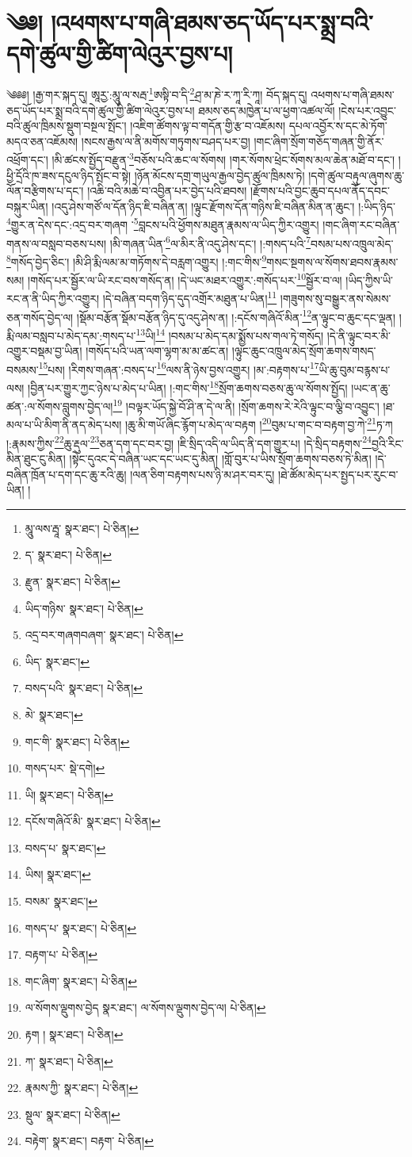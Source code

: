 \setcounter{footnote}{0} 
\chapter{༄༅། །འཕགས་པ་གཞི་ཐམས་ཅད་ཡོད་པར་སྨྲ་བའི་དགེ་ཚུལ་གྱི་ཚིག་ལེའུར་བྱས་པ།}༄༅༅། །རྒྱ་གར་སྐད་དུ། ཨཱརྱ་:མཱུ་ལ་སརྦ་\footnote{མཱུ་ལས་རྦཱ་  སྣར་ཐང་།  པེ་ཅིན། }ཨསྟི་བ་དི་\footnote{ད་  སྣར་ཐང་།  པེ་ཅིན། }ཤྲ་མ་ཎེ་ར་ཀཱ་རི་ཀཱ། བོད་སྐད་དུ། འཕགས་པ་གཞི་ཐམས་ཅད་ཡོད་པར་སྨྲ་བའི་དགེ་ཚུལ་གྱི་ཚིག་ལེའུར་བྱས་པ། ཐམས་ཅད་མཁྱེན་པ་ལ་ཕྱག་འཚལ་ལོ། །ངེས་པར་འབྱུང་བའི་ཚུལ་ཁྲིམས་སྡུག་བསྔལ་སྤོང་། །འཇིག་ཚོགས་ལྟ་བ་གདོན་གྱི་རྩ་བ་འཇོམས། དཔལ་འབྱོར་ས་དང་མེ་ཏོག་མདའ་ཅན་འཇོམས། །སངས་རྒྱས་ལ་ནི་མགོས་གཏུགས་བཤད་པར་བྱ། །གང་ཞིག་སྲོག་གཅོད་གཞན་གྱི་ནོར་འཕྲོག་དང་། །མི་ཚངས་སྤྱོད་བརྫུན་\footnote{རྫུན་  སྣར་ཐང་།  པེ་ཅིན། }བཅོས་པའི་ཆང་ལ་སོགས། །གར་སོགས་ཕྲེང་སོགས་མལ་ཆེན་མཐོ་བ་དང་། །ཕྱི་དྲོའི་ཁ་ཟས་དངུལ་ཉིད་སྤོང་བ་སྟེ། །ཉོན་མོངས་དགྲ་གཡུལ་རྒྱལ་བྱེད་ཚུལ་ཁྲིམས་ཏེ། །དགེ་ཚུལ་བརྟུལ་ཞུགས་ཆུ་ལོན་བརྩིགས་པ་དང་། །འཆི་བའི་མཆེ་བ་འབྱིན་པར་བྱེད་པའི་ཐབས། །རྫོགས་པའི་བྱང་ཆུབ་དཔལ་ནོད་དབང་བསྐུར་ཡིན། །འདུ་ཤེས་གཙོ་ལ་དོན་ཉིད་ཇི་བཞིན་ན། །ལྟུང་རྫོགས་དོན་གཉིས་ཇི་བཞིན་མིན་ན་ཆུང་། །:ཡིད་ཉིད་\footnote{ཡིད་གཉིས་  སྣར་ཐང་།  པེ་ཅིན། }གྱུར་ན་དེས་དང་:འདྲ་བར་གཞག ་\footnote{འདྲ་བར་གཞགབཞག་  སྣར་ཐང་།  པེ་ཅིན། }བླངས་པའི་ཕྱོགས་མཐུན་རྣམས་ལ་ཡིད་ཀྱིར་འགྱུར། །གང་ཞིག་རང་བཞིན་གནས་ལ་བསླབ་བཅས་པས། །མི་གཞན་ཡིན་\footnote{ཡིད་  སྣར་ཐང་། }ལ་མིར་ནི་འདུ་ཤེས་དང་། །:གསད་པའི་\footnote{བསད་པའི་  སྣར་ཐང་།  པེ་ཅིན། }བསམ་པས་འཁྲུལ་མེད་\footnote{མེ་  སྣར་ཐང་། }གསོད་བྱེད་ཅིང་། །མི་ཤི་རྨི་ལམ་མ་གཏོགས་དེ་བརླག་འགྱུར། །:གང་གིས་\footnote{གང་གི་  སྣར་ཐང་།  པེ་ཅིན། }གསང་སྔགས་ལ་སོགས་ཐབས་རྣམས་སམ། །གསོད་པར་སྦྱོར་ལ་ཡི་རང་བས་གསོད་ན། །དེ་ཡང་མཐར་འགྱུར་:གསོད་པར་\footnote{གསད་པར་  སྡེ་དགེ། }སྦྱོར་བ་ལ། །ཡིད་ཀྱིས་ཡི་རང་ན་ནི་ཡིད་ཀྱིར་འགྱུར། །དེ་བཞིན་བདག་ཉིད་དུད་འགྲོར་མཐུན་པ་ཡིན།\footnote{ཡི།  སྣར་ཐང་།  པེ་ཅིན། } །གཟུགས་སུ་བསྒྱུར་ནས་སེམས་ཅན་གསོད་བྱེད་ལ། །སྡོམ་བརྩོན་སྡོམ་བརྩོན་ཉིད་དུ་འདུ་ཤེས་ན། །:དངོས་གཞིའོ་མིན་\footnote{དངོས་གཞིའོ་མི་  སྣར་ཐང་།  པེ་ཅིན། }ན་ལྟུང་བ་ཆུང་དང་ལྡན། །རྨི་ལམ་བསླབ་པ་མེད་དམ་:གསད་པ་\footnote{བསད་པ་  སྣར་ཐང་། }ཡི།\footnote{ཡིས།  སྣར་ཐང་། } །བསམ་པ་མེད་དམ་སྨྱོས་པས་གལ་ཏེ་གསོད། །དེ་ནི་ལྟུང་བར་མི་འགྱུར་བསྡམ་བྱ་ཡིན། །གསོད་པའི་ཡན་ལག་ལྷག་མ་མ་ཚང་ན། །ལྟུང་ཆུང་འཁྲུལ་མེད་སྲོག་ཆགས་གསད་བསམས་\footnote{བསམ་  སྣར་ཐང་། }པས། །རིགས་གཞན་:བསད་པ་\footnote{གསད་པ་  སྣར་ཐང་།  པེ་ཅིན། }ལས་ནི་ཉེས་བྱས་འགྱུར། །མ་:བརྟགས་པ་\footnote{བརྟག་པ་  པེ་ཅིན། }ཡི་ཆུ་བུམ་བརྙས་པ་ལས། །བྱིན་པར་གྱུར་ཀྱང་ཉེས་པ་མེད་པ་ཡིན། །:གང་གིས་\footnote{གང་ཞིག་  སྣར་ཐང་།  པེ་ཅིན། }སྲོག་ཆགས་བཅས་ཆུ་ལ་སོགས་སྤྱོད། །ཡང་ན་ཆུ་ཚན་:ལ་སོགས་བླུགས་བྱེད་ལ།\footnote{ལ་སོགས་ལྡུགས་བྱེད  སྣར་ཐང་། ལ་སོགས་ལྡུགས་བྱེད་ལ།  པེ་ཅིན། } །བལྟར་ཡོད་སྐྱེ་བོ་ཤི་ན་དེ་ལ་ནི། །སྲོག་ཆགས་རེ་རེའི་ལྟུང་བ་ལྕི་བ་འབྱུང་། །ཐ་མལ་པ་ཡི་མིག་ནི་ནད་མེད་པས། །ཆུ་མི་གཡོ་ཞིང་རྙོག་པ་མེད་ལ་བརྟག །\footnote{རྟག །  སྣར་ཐང་།  པེ་ཅིན། }བུམ་པ་གང་བ་བརྟག་བྱ་ཀེ་\footnote{ཀ་  སྣར་ཐང་།  པེ་ཅིན། }ཏ་ཀ །:རྣམས་ཀྱིས་\footnote{རྣམས་ཀྱི་  སྣར་ཐང་།  པེ་ཅིན། }ཆུ་རྡུལ་\footnote{སྡུལ་  སྣར་ཐང་།  པེ་ཅིན། }ཅན་དག་དང་བར་བྱ། །ཇི་སྲིད་འདི་ལ་ཡིད་ནི་དག་གྱུར་པ། །དེ་སྲིད་བརྟགས་\footnote{བརྟེག་  སྣར་ཐང་། བརྟག་  པེ་ཅིན། }བྱའི་རིང་མིན་ཐུང་ངུ་མིན། །སྟེང་དུའང་དེ་བཞིན་ཡང་དང་ཡང་དུ་མིན། །གློ་བུར་པ་ཡིས་སྲོག་ཆགས་བཅས་ཏེ་མིན། །དེ་བཞིན་ཁྲོན་པ་དག་དང་ཆུ་རའི་ཆུ། །ལན་ཅིག་བརྟགས་པས་ཉི་མ་ཤར་བར་དུ། །ཐེ་ཚོམ་མེད་པར་སྤྱད་པར་རུང་བ་ཡིན། །
